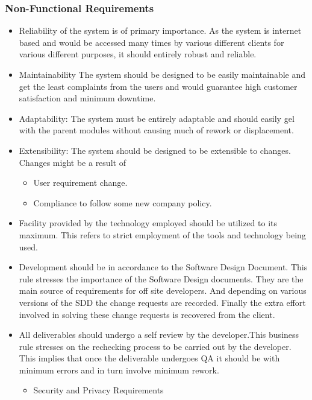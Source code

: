\subsubsection{Non-Functional Requirements}
\begin{itemize}
\item Reliability   of   the   system   is   of   primary   importance.   As   the   system   is internet  based and  would  be  accessed  many  times  by  various  different clients    for   various    different  purposes,   it   should   entirely   robust   and reliable.
\item Maintainability The system should  be  designed  to be easily maintainable and  get  the least complaints from the users and  would  guarantee  high customer satisfaction and  minimum downtime.
\item Adaptability: The  system  must  be  entirely  adaptable  and  should   easily  gel  with  the parent modules without causing much of rework or displacement.
\item Extensibility: The   system   should   be   designed   to   be   extensible   to   changes.   Changes might be a result of
\begin{itemize}
\item User requirement change.
\item Compliance to follow some new company policy.
\end{itemize}
\item Facility  provided  by  the  technology  employed  should  be  utilized  to its maximum. This refers to strict employment of the tools and technology being  used.
\item Development   should   be   in   accordance   to   the   Software   Design Document. This  rule stresses  the  importance of  the Software  Design documents.  They are    the    main    source    of    requirements    for    off    site    developers.    And depending   on   various   versions   of   the   SDD   the   change   requests   are recorded. Finally the extra effort involved in solving these change requests is recovered from the client.
\item All deliverables should undergo a self review by the       developer.This  business  rule  stresses  on  the  rechecking  process  to  be   carried  out  by the   developer.   This   implies   that   once   the   deliverable   undergoes   QA   it should be with minimum errors and in turn involve minimum rework.
\begin{itemize}
\item Security and Privacy Requirements

\end{itemize}
\end{itemize}
